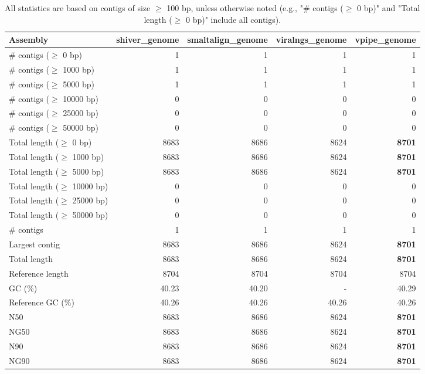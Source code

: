 \documentclass[12pt,a4paper]{article}
\begin{document}
\begin{table}[ht]
\begin{center}
\caption{All statistics are based on contigs of size $\geq$ 100 bp, unless otherwise noted (e.g., "\# contigs ($\geq$ 0 bp)" and "Total length ($\geq$ 0 bp)" include all contigs).}
\begin{tabular}{|l*{4}{|r}|}
\hline
Assembly & shiver\_genome & smaltalign\_genome & viralngs\_genome & vpipe\_genome \\ \hline
\# contigs ($\geq$ 0 bp) & 1 & 1 & 1 & 1 \\ \hline
\# contigs ($\geq$ 1000 bp) & 1 & 1 & 1 & 1 \\ \hline
\# contigs ($\geq$ 5000 bp) & 1 & 1 & 1 & 1 \\ \hline
\# contigs ($\geq$ 10000 bp) & 0 & 0 & 0 & 0 \\ \hline
\# contigs ($\geq$ 25000 bp) & 0 & 0 & 0 & 0 \\ \hline
\# contigs ($\geq$ 50000 bp) & 0 & 0 & 0 & 0 \\ \hline
Total length ($\geq$ 0 bp) & 8683 & 8686 & 8624 & {\bf 8701} \\ \hline
Total length ($\geq$ 1000 bp) & 8683 & 8686 & 8624 & {\bf 8701} \\ \hline
Total length ($\geq$ 5000 bp) & 8683 & 8686 & 8624 & {\bf 8701} \\ \hline
Total length ($\geq$ 10000 bp) & 0 & 0 & 0 & 0 \\ \hline
Total length ($\geq$ 25000 bp) & 0 & 0 & 0 & 0 \\ \hline
Total length ($\geq$ 50000 bp) & 0 & 0 & 0 & 0 \\ \hline
\# contigs & 1 & 1 & 1 & 1 \\ \hline
Largest contig & 8683 & 8686 & 8624 & {\bf 8701} \\ \hline
Total length & 8683 & 8686 & 8624 & {\bf 8701} \\ \hline
Reference length & 8704 & 8704 & 8704 & 8704 \\ \hline
GC (\%) & 40.23 & 40.20 & - & 40.29 \\ \hline
Reference GC (\%) & 40.26 & 40.26 & 40.26 & 40.26 \\ \hline
N50 & 8683 & 8686 & 8624 & {\bf 8701} \\ \hline
NG50 & 8683 & 8686 & 8624 & {\bf 8701} \\ \hline
N90 & 8683 & 8686 & 8624 & {\bf 8701} \\ \hline
NG90 & 8683 & 8686 & 8624 & {\bf 8701} \\ \hline

\end{tabular}
\end{center}
\end{table}
\end{document}
